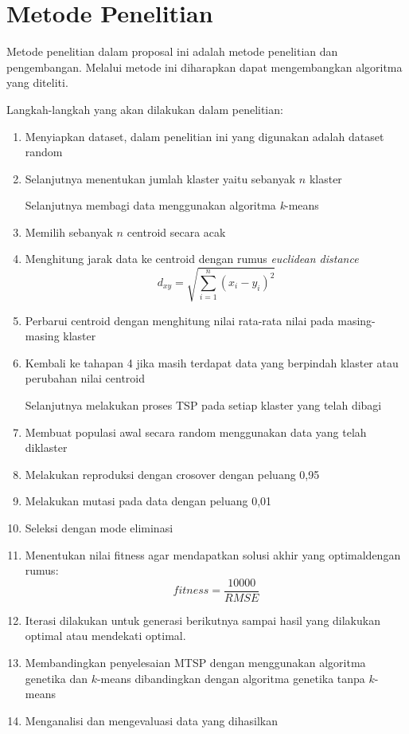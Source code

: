 \section{Metode Penelitian}

Metode penelitian dalam proposal ini adalah metode penelitian dan pengembangan. Melalui metode ini diharapkan dapat mengembangkan algoritma yang diteliti.

Langkah-langkah yang akan dilakukan dalam penelitian:
\begin{enumerate}
	\item Menyiapkan dataset, dalam penelitian ini yang digunakan adalah dataset random
	\item Selanjutnya menentukan jumlah klaster yaitu sebanyak $n$ klaster
	
	Selanjutnya membagi data menggunakan algoritma \textit{k}-means
	
	\item Memilih sebanyak $n$ centroid secara acak
	\item Menghitung jarak data ke centroid dengan rumus \textit{euclidean distance}
	\begin{equation}
	d_{xy}=\sqrt{\sum_{i=1}^{n}(x_i-y_i)^{2}}
	\end{equation}
	\item Perbarui centroid dengan menghitung nilai rata-rata nilai pada masing-masing klaster
	\item Kembali ke tahapan 4 jika masih terdapat data yang berpindah klaster atau perubahan nilai centroid
	
	Selanjutnya melakukan proses TSP pada setiap klaster yang telah dibagi
	
	\item Membuat populasi awal secara random menggunakan data yang telah diklaster
	\item Melakukan reproduksi dengan crosover dengan peluang 0,95
	\item Melakukan mutasi pada data dengan peluang 0,01
	\item Seleksi dengan mode eliminasi
	
	\item Menentukan nilai fitness agar mendapatkan solusi akhir yang optimaldengan rumus:
	\begin{equation}
	fitness=\frac{10000}{RMSE}
	\end{equation}
	\item Iterasi dilakukan untuk generasi berikutnya sampai hasil yang dilakukan optimal atau mendekati optimal.
	
	\item Membandingkan penyelesaian MTSP dengan menggunakan algoritma genetika dan $k$-means dibandingkan dengan algoritma genetika tanpa $k$-means
	
	\item Menganalisi dan mengevaluasi data yang dihasilkan

\end{enumerate}